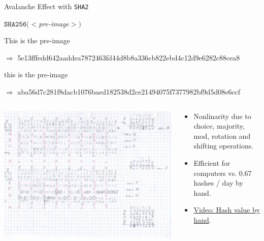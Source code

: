 \documentclass[handout]{beamer}
\begin{document}
\begin{frame}{Avalanche Effect with \texttt{SHA2}}

\begin{center}
$\texttt{SHA256}(<$\textit{pre-image}$>)$
\end{center}

This is the pre-image

$\Rightarrow$ \footnotesize 5e13fffedd642aaddea7872463fd44d8b8a336cb822ebd4c12d9e6282c88cea8 \normalsize
\vspace{1em}

\color{focus}t\color{black}his is the pre-image

$\Rightarrow$ \footnotesize \color{focus}aba56d7c281f8d\color{black}a\color{focus}cb1076baed182538d2ce21494075f7377982bf9d5d0\color{black}8\color{focus}e6ccf\color{black} \normalsize
\vspace{1em}

\begin{columns}[T]
	\begin{column}{0.35\textwidth}
		\includegraphics[width = 4 cm, frame]{../assets/images/manual_hashing_video.png}
	\end{column} %
	\begin{column}{0.65\textwidth}
		\begin{itemize}
			\item Nonlinarity due to choice, majority, mod, rotation and shifting operations.
			\item Efficient for computers vs. 0.67 hashes / day by hand.
			\item \link \href{https://www.youtube.com/watch?v=y3dqhixzGVo}{Video: Hash value by hand}.
		\end{itemize}
	\end{column}
\end{columns}
	
\end{frame}
\end{document}
